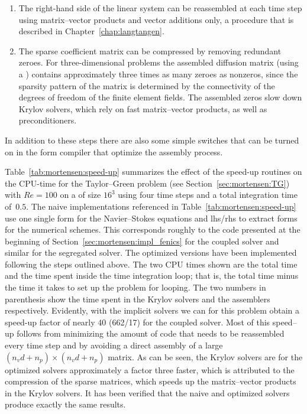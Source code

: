\begin{enumerate}
\item The right-hand side of the linear system can be reassembled
  at each time step using matrix--vector products and vector additions
  only, a procedure that is described in Chapter~\ref{chap:langtangen}.

\item The sparse coefficient matrix can be compressed by removing
  redundant zeroes. For three-dimensional problems the assembled
  diffusion matrix (using a ) contains
  approximately three times as many zeroes as nonzeros, since the
  sparsity pattern of the matrix is determined by the connectivity of
  the degrees of freedom of the finite element fields. The assembled
  zeros slow down Krylov solvers, which rely on fast matrix--vector
  products, as well as preconditioners.

\end{enumerate}
In addition to these steps there are also some simple switches that can
be turned on in the form compiler that optimize the assembly process.

Table~\ref{tab:mortensen:speed-up} summarizes the effect of the
speed-up routines on the CPU-time for the Taylor--Green problem (see
Section~\ref{sec:mortensen:TG}) with $Re=100$ on a  of
size $16^3$ using four time steps and a total integration time
of~$0.5$.  The naive implementations referenced in
Table~\ref{tab:mortensen:speed-up} use one single form for the
Navier--Stokes equations and lhs/rhs to extract forms for the
numerical schemes. This corresponds roughly to the code presented at
the beginning of Section~\ref{sec:mortensen:impl_fenics} for the
coupled solver and similar for the segregated solver. The optimized
versions have been implemented following the steps outlined above. The
two CPU times shown are the total time and the time spent inside the
time integration loop; that is, the total time minus the time it takes
to set up the problem for looping. The two numbers in parenthesis show
the time spent in the Krylov solvers and the assemblers
respectively. Evidently, with the implicit solvers we can for this
problem obtain a speed-up factor of nearly 40 (662/17) for the coupled
solver. Most of this speed--up follows from minimizing the amount of
code that needs to be reassembled every time step and by avoiding a
direct assembly of a large $(n_vd+n_p)\times (n_vd+n_p)$ matrix. As
can be seen, the Krylov solvers are for the optimized solvers
approximately a factor three faster, which is attributed to the
compression of the sparse matrices, which speeds up the matrix--vector
products in the Krylov solvers. It has been verified that the naive
and optimized solvers produce exactly the same results.

